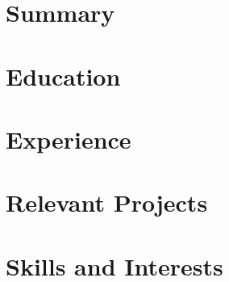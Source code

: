 \documentclass[letterpaper,10pt]{article}
\begin{document}


\vspace{-6mm} %
\section{Summary}


\vspace{-3mm} %
\section{Education}


\vspace{-9mm} %
\section{Experience}
\resumeSubHeadingListStart

      
      
      

  \resumeSubHeadingListEnd

  \vspace{-4.1mm} %

\section{Relevant Projects}
    \resumeSubHeadingListStart

     
     
     
     
     
     

    \resumeSubHeadingListEnd
  \vspace{-5mm} %

\section{Skills and Interests}

    
\end{document}
